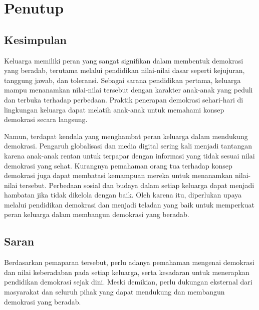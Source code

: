 \section{Penutup}


\subsection{Kesimpulan}

Keluarga memiliki peran yang sangat signifikan dalam membentuk demokrasi yang beradab, terutama melalui pendidikan nilai-nilai dasar seperti kejujuran, tanggung jawab, dan toleransi. Sebagai sarana pendidikan pertama, keluarga mampu menanamkan nilai-nilai tersebut dengan karakter anak-anak yang peduli dan terbuka terhadap perbedaan. Praktik penerapan demokrasi sehari-hari di lingkungan keluarga dapat melatih anak-anak untuk memahami konsep demokrasi secara langsung. 

Namun, terdapat kendala yang menghambat peran keluarga dalam mendukung demokrasi. Pengaruh globalisasi dan media digital sering kali menjadi tantangan karena anak-anak rentan untuk terpapar dengan informasi yang tidak sesuai nilai demokrasi yang sehat. Kurangnya pemahaman orang tua terhadap konsep demokrasi juga dapat membatasi kemampuan mereka untuk menanamkan nilai-nilai tersebut. Perbedaan sosial dan budaya dalam setiap keluarga dapat menjadi hambatan jika tidak dikelola dengan baik. Oleh karena itu, diperlukan upaya melalui pendidikan demokrasi dan menjadi teladan yang baik untuk memperkuat peran keluarga dalam membangun demokrasi yang beradab.

\subsection{Saran}

Berdasarkan pemaparan tersebut, perlu adanya pemahaman mengenai demokrasi dan nilai keberadaban pada setiap keluarga, serta kesadaran untuk menerapkan pendidikan demokrasi sejak dini. Meski demikian, perlu dukungan eksternal dari masyarakat dan seluruh pihak yang dapat mendukung dan membangun demokrasi yang beradab.